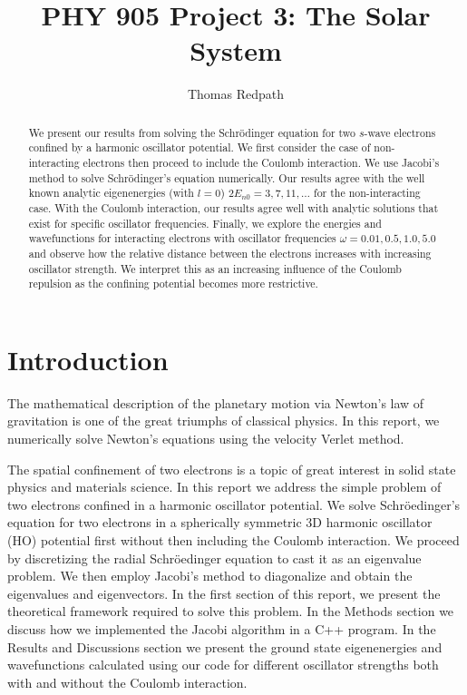 \documentclass[10pt,showpacs,preprintnumbers,footinbib,amsmath,amssymb,aps,prl,twocolumn,groupedaddress,superscriptaddress,showkeys]{revtex4-1}
\begin{document}
\title{PHY 905 Project 3: The Solar System}
\author{Thomas Redpath}
\begin{abstract}
We present our results from solving the Schr\"{o}dinger equation for two $s$-wave
electrons confined by a harmonic oscillator potential. We first consider the
case of non-interacting electrons then proceed to include the Coulomb
interaction. We use Jacobi's method to solve Schr\"{o}dinger's equation
numerically. Our results agree with the well known analytic eigenenergies
(with $l=0$) $2E_{n0} = 3,7,11,\dots$ for the non-interacting case. With the Coulomb
interaction, our results agree well with analytic solutions that exist for
specific oscillator frequencies. Finally, we explore the energies and wavefunctions
for interacting electrons with oscillator frequencies $\omega = 0.01,0.5,1.0,5.0$
and observe how the relative distance between the electrons increases with
increasing oscillator strength. We interpret this as an increasing influence of
the Coulomb repulsion as the confining potential becomes more restrictive.
\end{abstract}
\maketitle

\section{Introduction}

The mathematical description of the planetary motion via Newton's law
of gravitation is one of the great triumphs of classical physics. In this
report, we numerically solve Newton's equations using the velocity
Verlet method.

The spatial confinement of two electrons is a topic of great interest in
solid state physics and materials science. In this report we address
the simple problem of two electrons confined in a harmonic oscillator
potential. We solve Schr\"{o}edinger's equation for two electrons
in a spherically symmetric 3D harmonic oscillator (HO) potential first
without then including the Coulomb interaction. We proceed by
discretizing the radial Schr\"{o}edinger equation to cast it as an
eigenvalue problem. We then employ Jacobi's method to diagonalize
and obtain the eigenvalues and eigenvectors. In the first section of
this report, we present the theoretical framework required to solve
this problem. In the Methods section we discuss how we implemented
the Jacobi algorithm in a C++ program. In the Results and Discussions
section we present the ground state eigenenergies and wavefunctions
calculated using our code for different oscillator strengths both with and
without the Coulomb interaction.
\end{document}
